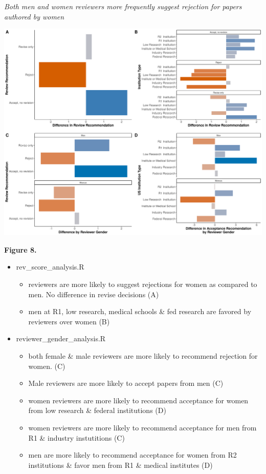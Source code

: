 \documentclass[11pt,]{article}
\providecommand{\tightlist}{%
  \setlength{\itemsep}{0pt}\setlength{\parskip}{0pt}}
\begin{document}
\emph{Both men and women reviewers more frequently suggest rejection for
papers authored by women}

\includegraphics{Figure_8.png}

\textbf{Figure 8.}

\begin{itemize}
\tightlist
\item
  rev\_score\_analysis.R

  \begin{itemize}
  \tightlist
  \item
    reviewers are more likely to suggest rejections for women as
    compared to men. No difference in revise decisions (A)
  \item
    men at R1, low research, medical schools \& fed research are favored
    by reviewers over women (B)
  \end{itemize}
\item
  reviewer\_gender\_analysis.R

  \begin{itemize}
  \tightlist
  \item
    both female \& male reviewers are more likely to recommend rejection
    for women. (C)
  \item
    Male reviewers are more likely to accept papers from men (C)
  \item
    women reviewers are more likely to recommend acceptance for women
    from low research \& federal institutions (D)
  \item
    women reviewers are more likely to recommend acceptance for men from
    R1 \& industry instutitions (C)
  \item
    men are more likely to recommend acceptance for women from R2
    institutions \& favor men from R1 \& medical institutes (D)
  \end{itemize}
\end{itemize}
\end{document}
